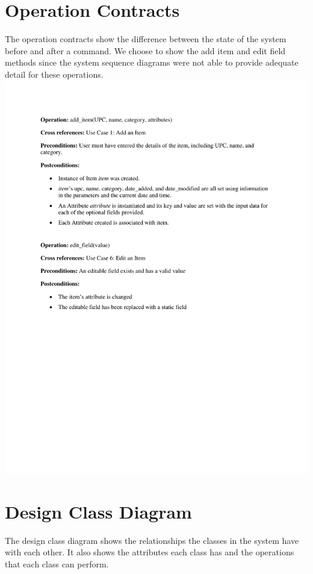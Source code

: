 \documentclass{article}
\begin{document}
\section{Operation Contracts}
The operation contracts show the difference between the state of the system before and after a command.  We choose to show the add item and edit field methods since the system sequence diagrams were not able to provide adequate detail for these operations.\\
\includegraphics[keepaspectratio, width=6in]{Operational_Contracts.pdf}\\

\section{Design Class Diagram}
The design class diagram shows the relationships the classes in the system have with each other.  It also shows the attributes each class has and the operations that each class can perform.\\
\end{document}
